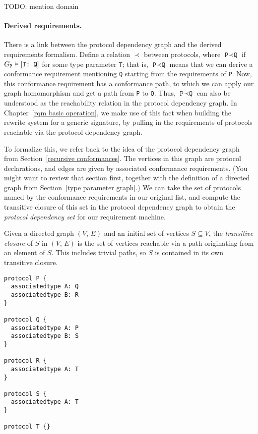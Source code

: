 \documentclass[../generics]{subfiles}
\begin{document}
TODO: mention domain

\paragraph{Derived requirements.}
There is a link between the protocol dependency graph and the derived requirements formalism. Define a relation \index{$\prec$}$\prec$ between protocols, where $\texttt{P}\prec\texttt{Q}$ if $G_\texttt{P}\vDash[\texttt{T:~Q}]$ for some type parameter \texttt{T}; that is, $\texttt{P}\prec\texttt{Q}$ means that we can derive a conformance requirement mentioning \texttt{Q} starting from the requirements of \texttt{P}. Now, this conformance requirement has a conformance path, to which we can apply our graph homomorphism and get a path from \texttt{P} to \texttt{Q}. Thus, $\texttt{P}\prec\texttt{Q}$ can also be understood as the reachability relation in the protocol dependency graph. In Chapter~\ref{rqm basic operation}, we make use of this fact when building the rewrite system for a generic signature, by pulling in the requirements of protocols reachable via the protocol dependency graph.

%
%
To formalize this, we refer back to the idea of the protocol dependency graph from Section~\ref{recursive conformances}. The vertices in this graph are protocol declarations, and edges are given by associated conformance requirements. (You might want to review that section first, together with the definition of a directed graph from Section~\ref{type parameter graph}.) We can take the set of protocols named by the conformance requirements in our original list, and compute the transitive closure of this set in the protocol dependency graph to obtain the \emph{protocol dependency set} for our requirement machine.

%
\begin{definition} Given a directed graph $(V,\, E)$ and an initial set of vertices $S\subseteq V$, the \emph{transitive closure} of $S$ in $(V,\, E)$ is the set of vertices reachable via a path originating from an element of $S$. This includes trivial paths, so $S$ is contained in its own transitive closure.
\end{definition}

\begin{listing}\label{protocol component listing}
\begin{Verbatim}
protocol P {
  associatedtype A: Q
  associatedtype B: R
}

protocol Q {
  associatedtype A: P
  associatedtype B: S
}

protocol R {
  associatedtype A: T
}

protocol S {
  associatedtype A: T
}

protocol T {}
\end{Verbatim}
\end{listing}
\end{document}
